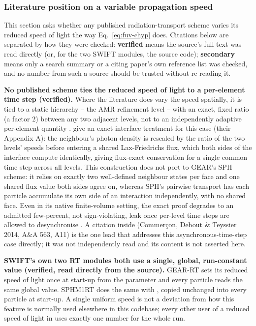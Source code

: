 \subsubsection{Literature position on a variable propagation speed}
\label{sec:fuv-chyp-literature}

This section asks whether any published radiation-transport scheme varies its
reduced speed of light the way Eq.~\ref{eq:fuv-chyp} does. Citations
below are separated by how they were checked: \textbf{verified}
means the source's full text was read directly (or, for the two SWIFT
modules, the source code); \textbf{secondary} means only a search
summary or a citing paper's own reference list was checked, and no
number from such a source should be trusted without re-reading it.

\textbf{No published scheme ties the reduced speed of light to a
per-element time step (verified).} Where the literature does vary the
speed spatially, it is tied to a static hierarchy -- the AMR refinement
level -- with an exact, fixed ratio (a factor $2$) between any two
adjacent levels, not to an independently adaptive per-element quantity
\citep{Katz2017,Rosdahl2018}. \citet{Katz2017} give an exact interface
treatment for this case (their Appendix A): the neighbour's photon
density is rescaled by the ratio of the two levels' speeds before
entering a shared Lax-Friedrichs flux, which both sides of the interface
compute identically, giving flux-exact conservation for a single common
time step across all levels. This construction does not port to GEAR's
SPH scheme: it relies on exactly two well-defined neighbour states per
face and one shared flux value both sides agree on, whereas SPH's
pairwise transport has each particle accumulate its own side of an
interaction independently, with no shared face. Even in its native
finite-volume setting, the exact proof degrades to an admitted
few-percent, not sign-violating, leak once per-level time steps are
allowed to desynchronise \citep{Katz2017,Rosdahl2018}. A citation inside
\citet{Katz2017} (Commer\c{c}on, Debout \& Teyssier 2014, A\&A 563, A11)
is the one lead that addresses this
asynchronous-time-step case directly; it was not independently read and
its content is not asserted here.

\textbf{SWIFT's own two RT modules both use a single, global, run-constant
value (verified, read directly from the source).} GEAR-RT
sets its reduced speed of light
once at start-up from the parameter  and every
particle reads the same global value. SPHM1RT does the same with
, copied unchanged into every particle at start-up. A
single uniform speed is not a deviation from how this feature is
normally used elsewhere in this codebase; every other user of a reduced
speed of light in \swift{} uses exactly one number for the whole run.


